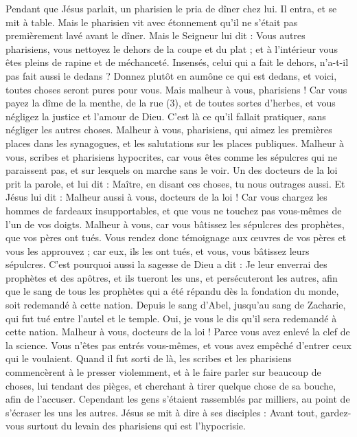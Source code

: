 \begin{multicols}{2}
Pendant que Jésus parlait, un pharisien le pria de dîner chez lui. Il entra, et se mit à table.
Mais le pharisien vit avec étonnement qu'il ne s'était pas premièrement lavé avant le dîner.
\TextTitle{[grandeur]}
Mais le Seigneur lui dit : Vous autres pharisiens, vous nettoyez le dehors de la coupe et du plat ; et à l’intérieur vous êtes pleins de rapine et de méchanceté.
Insensés, celui qui a fait le dehors, n'a-t-il pas fait aussi le dedans ?
Donnez plutôt en aumône ce qui est dedans, et voici, toutes choses seront pures pour vous.
Mais malheur à vous, pharisiens ! Car vous payez la dîme de la menthe, de la rue (3), et de toutes sortes d’herbes, et vous négligez la justice et l'amour de Dieu. C’est là ce qu’il fallait pratiquer, sans négliger les autres choses.
Malheur à vous, pharisiens, qui aimez les premières places dans les synagogues, et les salutations sur les places publiques.
Malheur à vous, scribes et pharisiens hypocrites, car vous êtes comme les sépulcres qui ne paraissent pas, et sur lesquels on marche sans le voir.
Un des docteurs de la loi prit la parole, et lui dit : Maître, en disant ces choses, tu nous outrages aussi.
Et Jésus lui dit : Malheur aussi à vous, docteurs de la loi ! Car vous chargez les hommes de fardeaux insupportables, et que vous ne touchez pas vous-mêmes de l’un de vos doigts.
Malheur à vous, car vous bâtissez les sépulcres des prophètes, que vos pères ont tués.
Vous rendez donc témoignage aux œuvres de vos pères et vous les approuvez ; car eux, ils les ont tués, et vous, vous bâtissez leurs sépulcres.
C'est pourquoi aussi la sagesse de Dieu a dit : Je leur enverrai des prophètes et des apôtres, et ils tueront les uns, et persécuteront les autres,
afin que le sang de tous les prophètes qui a été répandu dès la fondation du monde, soit redemandé à cette nation.
Depuis le sang d'Abel, jusqu'au sang de Zacharie, qui fut tué entre l'autel et le temple. Oui, je vous le dis qu'il sera redemandé à cette nation.
Malheur à vous, docteurs de la loi ! Parce vous avez enlevé la clef de la science. Vous n'êtes pas entrés vous-mêmes, et vous avez empêché d’entrer ceux qui le voulaient.
Quand il fut sorti de là, les scribes et les pharisiens commencèrent à le presser violemment, et à le faire parler sur beaucoup de choses,
lui tendant des pièges, et cherchant à tirer quelque chose de sa bouche, afin de l’accuser.
\TextTitle{[grandeur]}
\VerseOne{}Cependant les gens s'étaient rassemblés par milliers, au point de s’écraser les uns les autres. Jésus se mit à dire à ses disciples : Avant tout, gardez-vous surtout du levain des pharisiens qui est l'hypocrisie.

\end{multicols}
